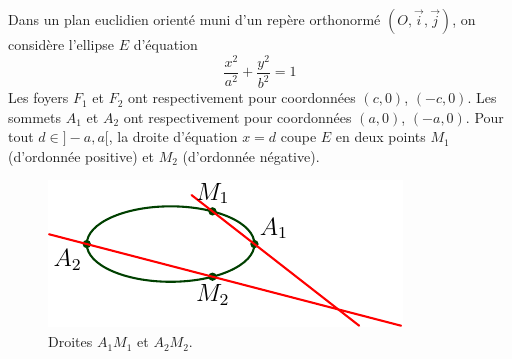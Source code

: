 Dans un plan euclidien orienté muni d'un repère orthonormé $(O,\overrightarrow{i},\overrightarrow{j})$, on considère l'ellipse $E$ d'équation
\begin{displaymath}
 \frac{x^2}{a^2}+\frac{y^2}{b^2}=1
\end{displaymath}
Les foyers $F_1$ et $F_2$ ont respectivement pour coordonnées $(c,0)$, $(-c,0)$. Les sommets $A_1$ et $A_2$ ont respectivement pour coordonnées $(a,0)$, $(-a,0)$. \newline
Pour tout $d\in]-a,a[$, la droite d'équation $x=d$ coupe $E$ en deux points $M_1$ (d'ordonnée positive) et $M_2$ (d'ordonnée négative).
\begin{figure}[h!t]
   \centering
   \includegraphics{Eellipse1_1.pdf}
   \caption{Droites $A_1M_1$ et $A_2M_2$.}
   \label{fig:Eellipse1_1}
\end{figure}

